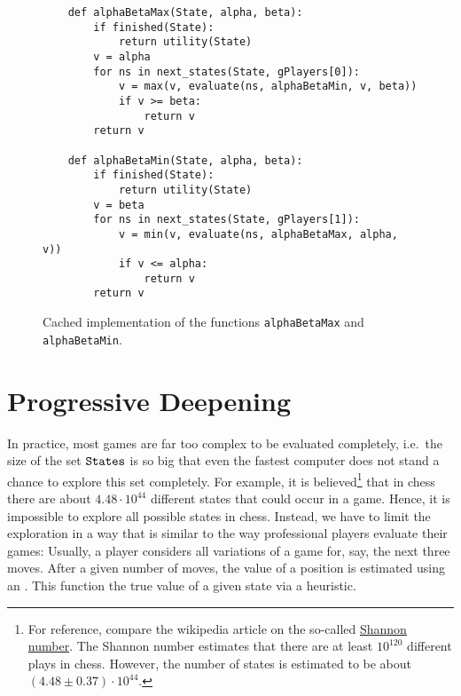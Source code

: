 \begin{figure}[!ht]
\centering
\begin{verbatim}
    def alphaBetaMax(State, alpha, beta):
        if finished(State):
            return utility(State)
        v = alpha
        for ns in next_states(State, gPlayers[0]):
            v = max(v, evaluate(ns, alphaBetaMin, v, beta))
            if v >= beta:
                return v
        return v
    
    def alphaBetaMin(State, alpha, beta):
        if finished(State):
            return utility(State)
        v = beta
        for ns in next_states(State, gPlayers[1]):
            v = min(v, evaluate(ns, alphaBetaMax, alpha, v))
            if v <= alpha:
                return v
        return v
\end{verbatim}
\vspace*{-0.3cm}
\caption{Cached implementation of the functions \texttt{alphaBetaMax} and \texttt{alphaBetaMin}.}
\label{fig:alphaBetaCached}
\end{figure}
\FloatBarrier

\section{Progressive Deepening}
In practice, most games are far too complex to be evaluated completely, i.e.~the size of the set
$\texttt{States}$ is so big that even the fastest computer does not stand a chance to explore this set
completely.  For example, it is believed\footnote{
  For reference, compare the wikipedia article on the so-called
  \href{https://en.wikipedia.org/wiki/Shannon_number}{Shannon number}.
  The Shannon number estimates that there are at least $10^{120}$ different plays in chess.  However, the
  number of states is estimated to be about $(4.48\pm 0.37) \cdot 10^{44}$. 
}
that in chess there are about $4.48 \cdot 10^{44}$ different states that could occur in a game.
Hence, it is impossible to explore all possible states in chess.  Instead, we have to limit
the exploration in a way that is similar to the way professional players evaluate their games:  Usually, a
player considers all variations of a game for, say, the next three moves.  After a given number of moves, the
value of a position is estimated using an .  This function  the true
value of a given state via a heuristic.

